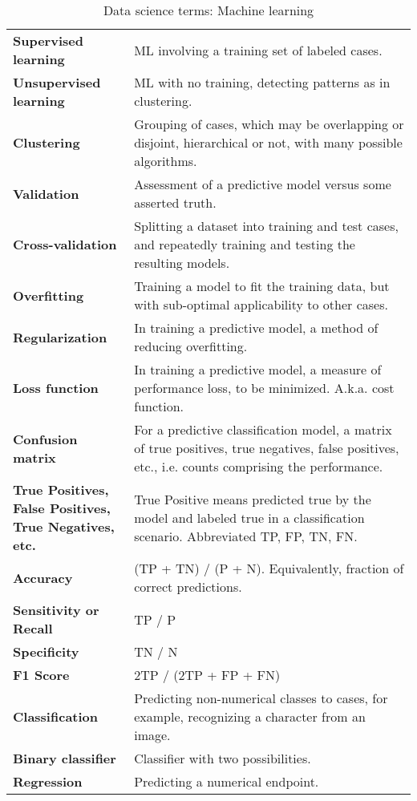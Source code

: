 \begin{appendices}
\begin{singlespace}
\begin{longtable}{p{0.3\linewidth}p{0.7\linewidth}}
\caption{Data science terms: Machine learning}\\
\hline
\textbf{Supervised learning} & ML involving a training set of labeled cases. \\
\textbf{Unsupervised learning} & ML with no training, detecting patterns as in clustering. \\
\textbf{Clustering} & Grouping of cases, which may be overlapping or disjoint, hierarchical or not, with many possible algorithms. \\
\textbf{Validation} & Assessment of a predictive model versus some asserted truth. \\
\textbf{Cross-validation} & Splitting a dataset into training and test cases, and repeatedly training and testing the resulting models. \\
\textbf{Overfitting} & Training a model to fit the training data, but with sub-optimal applicability to other cases. \\
\textbf{Regularization} & In training a predictive model, a method of reducing overfitting. \\
\textbf{Loss function} & In training a predictive model, a measure of performance loss, to be minimized.  A.k.a. cost function. \\
\textbf{Confusion matrix} & For a predictive classification model, a matrix of true positives, true negatives, false positives, etc., i.e. counts comprising the performance. \\
\textbf{True Positives, False Positives, True Negatives, etc.} & True Positive means predicted true by the model and labeled true in a classification scenario.  Abbreviated TP, FP, TN, FN. \\
\textbf{Accuracy} & (TP + TN) / (P + N).  Equivalently, fraction of correct predictions. \\
\textbf{Sensitivity or Recall} & TP / P \\
\textbf{Specificity} & TN / N \\
\textbf{F1 Score} & 2TP / (2TP + FP + FN) \\
\textbf{Classification} & Predicting non-numerical classes to cases, for example, recognizing a character from an image. \\
\textbf{Binary classifier} & Classifier with two possibilities. \\
\textbf{Regression} & Predicting a numerical endpoint. \\

\end{longtable}
\end{singlespace}
\end{appendices}
